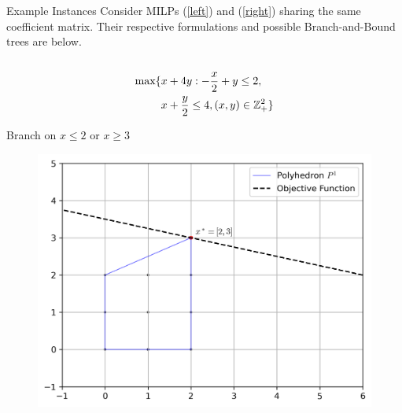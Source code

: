 \documentclass[final]{beamer}
\newlength{\colwidth}
\begin{document}
\begin{frame}[t]
\begin{columns}[t]
\begin{column}{\colwidth}
  \begin{block}{Example Instances}
	Consider MILPs (\ref{left}) and (\ref{right}) sharing the same coefficient matrix. Their respective formulations and possible Branch-and-Bound trees are below.
    \begin{columns}[T]
    	\begin{column}{0.45\textwidth}
    		\begin{align}
    			\begin{split}
    				\text{max} \{ &x + 4y : -\frac{x}{2} + y \leq 2, \\
    				&x + \frac{y}{2} \leq 4, (x, y) \in \mathbb{Z}^2_+ \} 
    			\end{split}
    			\label{left}
    		\end{align}
    		\begin{figure}[h]
    			\label{p:root}
    		\end{figure}
    		\centering
    		Branch on $ x \leq 2 $ or $ x \geq 3 $
    		\begin{figure}[]
    			\centering
    			\includegraphics[width=.45\textwidth]{P1.png}

\end{figure}
\end{column}
\end{columns}
\end{block}
\end{column}
\end{columns}
\end{frame}
\end{document}
